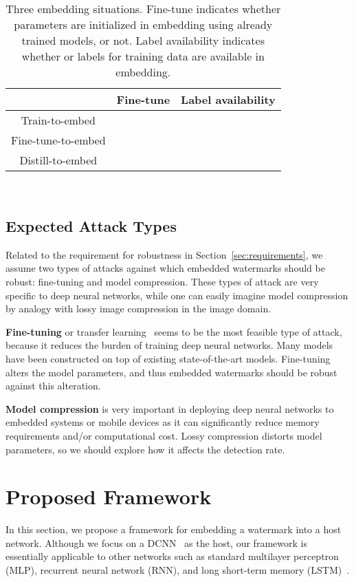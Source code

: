 \documentclass[10pt,twocolumn,letterpaper]{article}
\begin{document}
\begin{table}[tb]
	\centering
	\caption{Three embedding situations. Fine-tune indicates whether parameters are initialized in embedding using already trained models, or not. Label availability indicates whether or labels for training data are available in embedding.}
	\label{tab:settings}
	\begin{tabular}{c|cc} \hline
					& Fine-tune		& Label availability		\\ \hline
Train-to-embed		&				& \checkmark	\\
Fine-tune-to-embed	& \checkmark	& \checkmark	\\
Distill-to-embed	& \checkmark	&				\\ \hline
	\end{tabular} \\
\end{table}


\subsection{Expected Attack Types}
\label{sec:attack}
Related to the requirement for robustness in Section~\ref{sec:requirements}, we assume two types of attacks against which embedded watermarks should be robust: fine-tuning and model compression.
These types of attack are very specific to deep neural networks, while one can easily imagine model compression by analogy with lossy image compression in the image domain.

\textbf{Fine-tuning} or transfer learning~\cite{Simonyan_iclr15} seems to be the most feasible type of attack, because it reduces the burden of training deep neural networks.
Many models have been constructed on top of existing state-of-the-art models.
Fine-tuning alters the model parameters, and thus embedded watermarks should be robust against this alteration.

\textbf{Model compression} is very important in deploying deep neural networks to embedded systems or mobile devices as it can significantly reduce memory requirements and/or computational cost.
Lossy compression distorts model parameters, so we should explore how it affects the detection rate.


\section{Proposed Framework}
In this section, we propose a framework for embedding a watermark into a host network.
Although we focus on a DCNN~\cite{lec_ieee98} as the host, our framework is essentially applicable to other networks such as standard multilayer perceptron (MLP), recurrent neural network (RNN), and long short-term memory (LSTM)~\cite{hoch_nc1997}.
\end{document}

